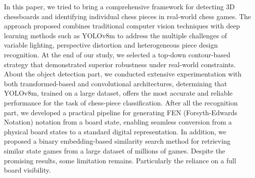 In this paper, we tried to bring a comprehensive framework for detecting 3D chessboards and identifying individual chess pieces in real-world chess games.
The approach proposed combines traditional computer vision techniques with deep learning methods such as YOLOv8m to address the multiple challenges of variable lighting,
perspective distortion and heterogeneous piece design recognition. \newline
At the end of our study, we selected a top-down contour-based strategy that demonstrated superior robustness under real-world constraints.
About the object detection part, we conducted extensive experimentation with both transformed-based and convolutional architectures, determining that YOLOv8m, trained on a large dataset, offers the most accurate and reliable performance for the task of chess-piece classification.
\newline
After all the recognition part, we developed a practical pipeline for generating FEN (Forsyth-Edwards Notation) notation from a board state, enabling seamless conversion from a physical board states to a standard digital representation.
In addition, we proposed a binary embedding-based similarity search method for retrieving similar state games  from a large dataset of millions of games.
\newline
Despite the promising results, some limitation remains.
Particularly the reliance on a full board visibility.
